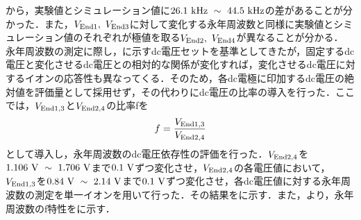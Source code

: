 から，実験値とシミュレーション値に$26.1 \ {\rm kHz} \ \sim \ 44.5 \ {\rm kHz}$の差があることが分かった．また，$V_{\rm End1}, \ V_{\rm End3}$に対して変化する永年周波数と同様に実験値とシミュレーション値のそれぞれが極値を取る$V_{\rm End2}, \ V_{\rm End4}$が異なることが分かる．
%
\clearpage
%
永年周波数の測定に際し，に示すdc電圧セットを基準としてきたが，固定するdc電圧と変化させるdc電圧との相対的な関係が変化すれば，変化させるdc電圧に対するイオンの応答性も異なってくる．そのため，各dc電極に印加するdc電圧の絶対値を評価量として採用せず，その代わりにdc電圧の比率の導入を行った．ここでは，$V_{\rm End1,3}$と$V_{\rm End2,4}$の比率fを
\large
\begin{align}
f = \frac{V_{\rm End1,3}}{V_{\rm End2,4}}
\end{align}
\normalsize
として導入し，永年周波数のdc電圧依存性の評価を行った．$V_{\rm End2,4}$を$1.106 \ {\rm V} \ \sim \ 1.706 \ {\rm V}$まで$0.1 \ {\rm V}$ずつ変化させ，$V_{\rm End2,4}$の各電圧値において，$V_{\rm End1,3}$を$0.84 \ {\rm V} \ \sim \ 2.14 \ {\rm V}$まで$0.1 \ {\rm V}$ずつ変化させ，各dc電圧値に対する永年周波数の測定を単一イオンを用いて行った．その結果をに示す．また，より，永年周波数のf特性をに示す．
